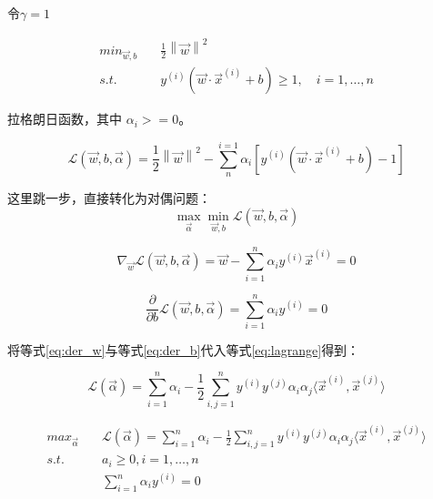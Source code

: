 \documentclass[letterpaper,11pt]{article}
\numberwithin{equation}{section}
\begin{document}
令$\gamma=1$

\begin{equation}
    \begin{aligned}
        min_{\vec{w},b} \quad & \frac{1}{2} {\left \| \vec{w} \right \|}^2                        \\
        s.t. \quad            & y^{(i)}(\vec{w} \cdot \vec{x}^{(i)} + b) \ge 1, \quad i=1,\dots,n
    \end{aligned}
\end{equation}

拉格朗日函数，其中 $\alpha_i>=0$。

\begin{equation}
    \mathcal{L}(\vec{w},b,\vec{\alpha})=\frac{1}{2} {\left \| \vec{w} \right \|}^2-\sum_{n}^{i=1}\alpha_i \left[ y^{(i)}(\vec{w} \cdot \vec{x}^{(i)} + b)-1 \right]
    \label{eq:lagrange}
\end{equation}

这里跳一步，直接转化为对偶问题：
\begin{equation}
    \mathop{max}_{\vec{\alpha}}\mathop{min}_{\vec{w},b}\mathcal{L}(\vec{w},b,\vec{\alpha})
\end{equation}

\begin{equation}
    \nabla_{\vec{w}}\mathcal{L}(\vec{w},b,\vec{\alpha})=\vec{w}-\sum_{i=1}^{n}\alpha_iy^{(i)}\vec{x}^{(i)}=0
    \label{eq:der_w}
\end{equation}

\begin{equation}
    \frac{\partial}{\partial b}\mathcal{L}(\vec{w},b,\vec{\alpha})=\sum_{i=1}^{n}\alpha_i y^{(i)}=0
    \label{eq:der_b}
\end{equation}

将等式\ref{eq:der_w}与等式\ref{eq:der_b}代入等式\ref{eq:lagrange}得到：

\begin{equation}
    \mathcal{L}(\vec{\alpha})=\sum_{i=1}^{n}\alpha_i - \frac{1}{2}\sum_{i,j=1}^{n}y^{(i)}y^{(j)}\alpha_i \alpha_j \langle \vec{x}^{(i)} , \vec{x}^{(j)} \rangle
\end{equation}

\begin{equation}
    \begin{aligned}
        max_{\vec{\alpha}} \quad & \mathcal{L}(\vec{\alpha})=\sum_{i=1}^{n}\alpha_i - \frac{1}{2}\sum_{i,j=1}^{n}y^{(i)}y^{(j)}\alpha_i \alpha_j \langle \vec{x}^{(i)} , \vec{x}^{(j)} \rangle \\
        s.t. \quad               & a_i \ge 0, i=1,\dots,n                                                                                                                                      \\
                                 & \sum_{i=1}^{n}\alpha_iy^{(i)}=0
    \end{aligned}
\end{equation}
\end{document}
